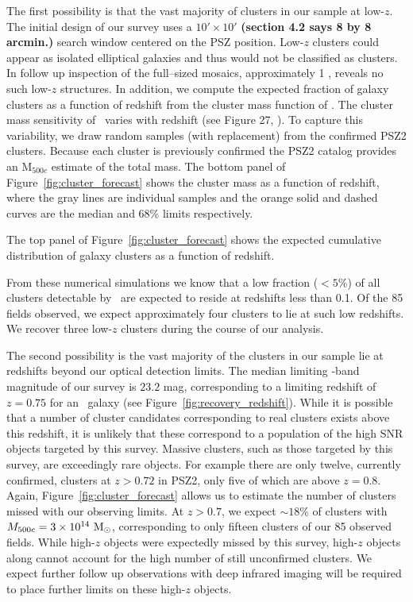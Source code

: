 \documentclass[apj, revtex4-1]{emulateapj}
\begin{document}
The first possibility is that the vast majority of clusters in our sample at low-$z$. The initial design of our survey uses a $10'\times10'$ {\bf (section 4.2 says 8 by 8 arcmin.)}  search window centered on the PSZ position. Low-$z$ clusters could appear as isolated elliptical galaxies and thus would not be classified as clusters. In follow up inspection of the full--sized mosaics, approximately 1 \degsq, reveals no such low-$z$ structures. In addition, we compute the expected fraction of galaxy clusters as a function of redshift from the cluster mass function of \cite{Tinker2008}. The cluster mass sensitivity of \planck\ varies with redshift (see Figure 27, \citealt{PlanckCollaboration2015a}). To capture this variability, we draw random samples (with replacement)  from the confirmed PSZ2 clusters. Because each cluster is previously confirmed the PSZ2 catalog provides an M$_{500c}$ estimate of the total mass. The bottom panel of Figure~\ref{fig:cluster_forecast} shows the cluster mass as a function of redshift, where the gray lines are individual samples and the orange solid and dashed curves are the median and 68\% limits respectively.

The top panel of Figure~\ref{fig:cluster_forecast} shows the expected cumulative distribution of galaxy clusters as a function of redshift.

From these numerical simulations we know that a low fraction ($<5\%$) of all clusters detectable by \planck\ are expected to reside at redshifts less than 0.1. Of the 85 fields observed, we expect approximately four clusters to lie at such low redshifts. We recover three low-$z$ clusters during the course of our analysis.

The second possibility is the vast majority of the clusters in our sample lie at redshifts beyond our optical detection limits. The median limiting \sdssi-band magnitude of our survey is $23.2$ mag, corresponding to a limiting redshift of $z=0.75$ for an \mstar\ galaxy (see Figure~\ref{fig:recovery_redshift}). While it is possible that a number of cluster candidates corresponding to real clusters exists above this redshift, it is unlikely that these correspond to a population of the high SNR objects targeted by this survey. Massive clusters, such as those targeted by this survey, are exceedingly rare objects. For example there are only twelve, currently confirmed, clusters at $z>0.72$ in PSZ2, only five of which are above $z=0.8$. Again, Figure~\ref{fig:cluster_forecast} allows us to estimate the number of clusters missed with our observing limits. At $z>0.7$, we expect $\sim18\%$ of clusters with $M_{500c}=3\times10^{14}~\hbox{$\mathrm{M}_\odot$}$, corresponding to only fifteen clusters of our 85 observed fields. While high-$z$ objects were expectedly missed by this survey, high-$z$ objects along cannot account for the high number of still unconfirmed clusters. We expect further follow up observations with deep infrared imaging will be required to place further limits on these high-$z$ objects.
\end{document}
